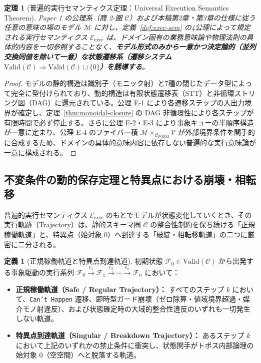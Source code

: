 \documentclass[11pt,a4paper]{ltjsarticle}
\theoremstyle{definition}
\newtheorem{definition}{定義}[section]
\theoremstyle{plain}
\newtheorem{theorem}{定理}[section]
\theoremstyle{remark}
\newcommand{\Valid}{\mathrm{Valid}}
\newcommand{\Cform}{\mathcal{C}_{\mathrm{FORM}}}
\begin{document}
\begin{theorem}[普遍的実行セマンティクス定理：Universal Execution Semantics Theorem]\label{thm:univ-exec}
Paper 1 の公理系（商 2-圏 $\mathcal{C}$）および本稿第2章・第3章の仕様に従う任意の意味の場のモデル $\mathcal{M}$ に対し、定義~\ref{def:exec-sem} の4公理によって規定される実行セマンティクス $\mathcal{E}_{\mathrm{exec}}$ は、ドメイン固有の業務意味論や物理法則の具体的内容を一切参照することなく、\textbf{モデル形式のみから一意かつ決定論的（並列交換同値を除いて一意）な状態遷移系（遷移システム $\Valid(\mathcal{C}) \Rightarrow \Valid(\mathcal{C}) \sqcup \{0\}$）を誘導する}。
\end{theorem}

\begin{proof}
モデルの静的構造は識別子（モニック射）と7種の閉じたデータ型によって完全に型付けられており、動的構造は有限状態遷移表（STT）と非循環ストリング図（DAG）に還元されている。公理 E-1 により各遷移ステップの入出力境界が確定し、定理~\ref{thm:monoidal-closure} の DAG 非循環性により各ステップが有限時間で必ず停止する。さらに公理 E-2・E-3 により事象キューの半順序構造が一意に定まり、公理 E-4 のファイバー積 $\mathcal{M} \times_{\Cform} \mathcal{V}$ が外部境界条件を関手的に合成するため、ドメインの具体的意味内容に依存しない普遍的な実行意味論が一意に構成される。
\end{proof}

\subsection{不変条件の動的保存定理と特異点における崩壊・相転移}
普遍的実行セマンティクス $\mathcal{E}_{\mathrm{exec}}$ のもとでモデルが状態変化していくとき、その実行軌跡（Trajectory）は、静的スキーマ圏 $\mathcal{C}$ の整合性制約を保ち続ける「正規稼働軌道」と、特異点（始対象 $0$）へ到達する「破綻・相転移軌道」の二つに厳密に二分される。

\begin{definition}[正規稼働軌道と特異点到達軌道]\label{def:trajectories}
初期状態 $\mathcal{F}_0 \in \Valid(\mathcal{C})$ から出発する事象駆動の実行系列 $\mathcal{F}_0 \xrightarrow{e_1} \mathcal{F}_1 \xrightarrow{e_2} \cdots \xrightarrow{e_n} \mathcal{F}_n$ において：
\begin{itemize}
    \item \textbf{正規稼働軌道（Safe / Regular Trajectory）：} すべてのステップ $k$ において、\texttt{Can't Happen} 遷移、即時型ガード崩壊（ゼロ除算・値域境界超過・媒介モノ射違反）、および状態確定時の大域的整合性違反のいずれも一切発生しない軌道。
    \item \textbf{特異点到達軌道（Singular / Breakdown Trajectory）：} あるステップ $k$ において上記のいずれかの禁止条件に衝突し、状態関手がトポス内部論理の始対象 $0$（空空間）へと脱落する軌道。
\end{itemize}
\end{definition}
\end{document}
